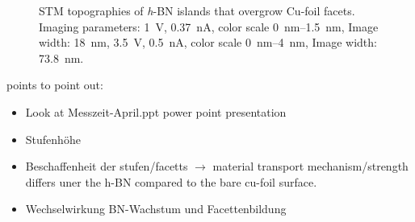 \begin{figure}
 \centering
{} \quad %
%
\caption{STM topographies of \textit{h}-BN islands that overgrow Cu-foil facets. Imaging parameters: 		
 		\SI{1}{\volt}, \SI{0.37}{\nano\ampere}, 
 		color scale \SIrange{0}{1.5}{\nano \meter}, 
 		Image width: \SI{18}{\nano \meter}, 
 		\SI{3.5}{\volt}, \SI{0.5}{\nano\ampere}, 
 		color scale \SIrange{0}{4}{\nano \meter}, 
 		Image width: \SI{73,8}{\nano \meter}. 
}%
\label{fig:h-bn-overgrown-cu}
\end{figure}
points to point out:
\begin{itemize}
 \item Look at Messzeit-April.ppt power point presentation
 \item Stufenh\"ohe
 \item Beschaffenheit der stufen/facetts $\rightarrow$ material transport mechanism/strength differs uner the h-BN compared to the bare cu-foil surface.
 \item Wechselwirkung BN-Wachstum und Facettenbildung
\end{itemize}


